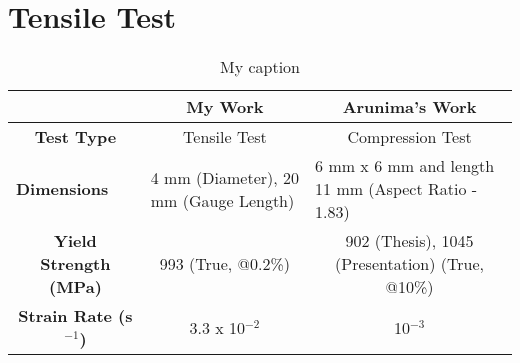 \newpage
\renewcommand{\workingDate}{\textsc{2017 $|$ September $|$ 13}}

\section{Tensile Test}

\begin{table}[H]
\centering
{}
\caption{Tensile Test of Ti-6242 Alloy}
\label{my-label}
\end{table}


\begin{table}[H]
\centering
\begin{tabular}{c|c|c|}
\cline{2-3}
                                                        & \textbf{My Work}                                           & \textbf{Arunima's Work}                                                 \\ \hline
\multicolumn{1}{|c|}{\textbf{Test Type}}                & Tensile Test                                               & Compression Test                                                        \\ \hline
\multicolumn{1}{|l|}{\textbf{Dimensions}}               & \multicolumn{1}{l|}{4 mm (Diameter), 20 mm (Gauge Length)} & \multicolumn{1}{l|}{6 mm x 6 mm and length 11 mm (Aspect Ratio - 1.83)} \\ \hline
\multicolumn{1}{|c|}{\textbf{Yield Strength (MPa)}}     & 993 (True, @0.2\%)                                         & 902 (Thesis), 1045 (Presentation) (True, @10\%)                         \\ \hline
\multicolumn{1}{|c|}{\textbf{Strain Rate (s$ ^{-1} $)}} & 3.3 x 10$^{-2}$                                            & 10$^{-3}$                                                               \\ \hline
\end{tabular}
\caption{My caption}
\label{my-label}
\end{table}